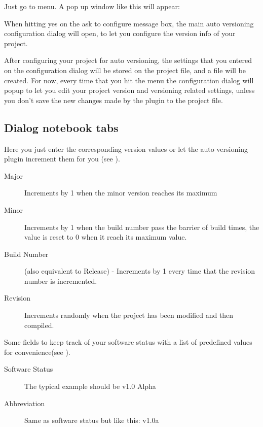 Just go to  menu. A pop up window like this will appear:


When hitting yes on the ask to configure message box, the main auto versioning configuration dialog will open, to let you configure the version info of your project.

After configuring your project for auto versioning, the settings that you entered on the configuration dialog will be stored on the project file, and a  file will be created. For now, every time that you hit the  menu the configuration dialog will popup to let you edit your project version and versioning related settings, unless you don't save the new changes made by the plugin to the project file.

\subsection{Dialog notebook tabs}

Here you just enter the corresponding version values or let the auto versioning plugin increment them for you (see ).

\begin{description}
\item[Major] Increments by 1 when the minor version reaches its maximum
\item[Minor] Increments by 1 when the build number pass the barrier of build times, the value is reset to 0 when it reach its maximum value.
\item[Build Number] (also equivalent to Release) - Increments by 1 every time that the revision number is incremented.
\item[Revision] Increments randomly when the project has been modified and then compiled.
\end{description}



Some fields to keep track of your software status with a list of predefined values for convenience(see ).

\begin{description}
\item[Software Status] The typical example should be v1.0 Alpha
\item[Abbreviation] Same as software status but like this: v1.0a
\end{description}


